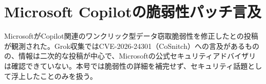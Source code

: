 \section{Microsoft Copilotの脆弱性パッチ言及}
MicrosoftがCopilot関連のワンクリック型データ窃取脆弱性を修正したとの投稿が観測された。Grok収集ではCVE-2026-24301（CoSnitch）への言及があるものの、情報は二次的な投稿が中心で、Microsoftの公式セキュリティアドバイザリは確認できていない。本号では脆弱性の詳細を補完せず、セキュリティ話題として浮上したことのみを扱う。

